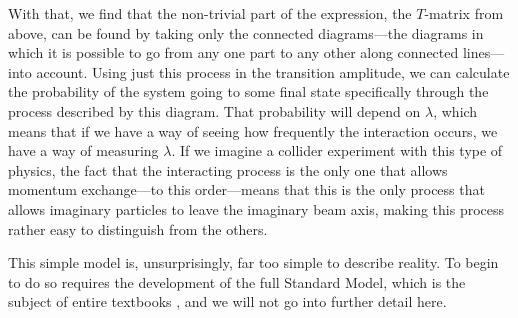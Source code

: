 With that, we find that the non-trivial part of the expression, the $T$-matrix from above, can be found by taking only the connected diagrams---the diagrams in which it is possible to go from any one part to any other along connected lines---into account. Using just this process in the transition amplitude, we can calculate the probability of the system going to some final state specifically through the process described by this diagram. That probability will depend on $\lambda$, which means that if we have a way of seeing how frequently the interaction occurs, we have a way of measuring $\lambda$. If we imagine a collider experiment with this type of physics, the fact that the interacting process is the only one that allows momentum exchange---to this order---means that this is the only process that allows imaginary particles to leave the imaginary beam axis, making this process rather easy to distinguish from the others.

This simple model is, unsurprisingly, far too simple to describe reality. To begin to do so requires the development of the full Standard Model, which is the subject of entire textbooks \cite{srednicki}, and we will not go into further detail here.

